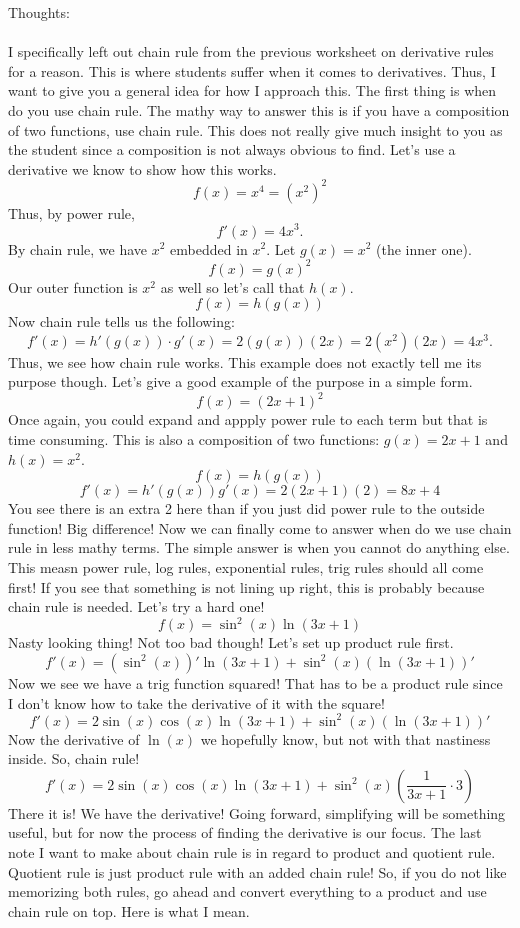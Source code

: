 \documentclass[10pt]{article}
\theoremstyle{Theorem}
\theoremstyle{definition}
\theoremstyle{remark}
\theoremstyle{custom}
\begin{document}
\thispagestyle{firststyle}
\pagestyle{plain}

Thoughts:\\\\
I specifically left out chain rule from the previous worksheet on derivative rules for a reason. This is where students suffer when it comes to derivatives. Thus, I want to give you a general idea for how I approach this. The first thing is when do you use chain rule. The mathy way to answer this is if you have a composition of two functions, use chain rule. This does not really give much insight to you as the student since a composition is not always obvious to find. Let's use a derivative we know to show how this works.
\[
f(x)=x^4=(x^2)^2
\]
Thus, by power rule,
\[
f'(x)=4x^3.
\]
By chain rule, we have $x^2$ embedded in $x^2$. Let $g(x)=x^2$ (the inner one).
\[
f(x)=g(x)^2
\]
Our outer function is $x^2$ as well so let's call that $h(x)$.
\[
f(x)=h(g(x))
\]
Now chain rule tells us the following:
\[
f'(x)=h'(g(x))\cdot g'(x)=2(g(x))(2x)=2(x^2)(2x)=4x^3.
\]
Thus, we see how chain rule works.  This example does not exactly tell me its purpose though. Let's give a good example of the purpose in a simple form.
\[
f(x)=(2x+1)^2
\]
Once again, you could expand and appply power rule to each term but that is time consuming. This is also a composition of two functions: $g(x)=2x+1$ and $h(x)=x^2$.
\[
f(x)=h(g(x))
\]
\[
f'(x)=h'(g(x))g'(x)=2(2x+1)(2)=8x+4
\]
You see there is an extra 2 here than if you just did power rule to the outside function! Big difference! Now we can finally come to answer when do we use chain rule in less mathy terms. The simple answer is when you cannot do anything else. This measn power rule, log rules, exponential rules, trig rules should all come first! If you see that something is not lining up right, this is probably because chain rule is needed. Let's try a hard one!
\[
f(x)=\sin^2(x)\ln(3x+1)
\]
Nasty looking thing! Not too bad though! Let's set up product rule first.
\[
f'(x)=(\sin^2(x))'\ln(3x+1)+\sin^2(x)(\ln(3x+1))'
\]
Now we see we have a trig function squared! That has to be a product rule since I don't know how to take the derivative of it with the square!
\[
f'(x)=2\sin(x)\cos(x)\ln(3x+1)+\sin^2(x)(\ln(3x+1))'
\]
Now the derivative of $\ln(x)$ we hopefully know, but not with that nastiness inside. So, chain rule!
\[
f'(x)=2\sin(x)\cos(x)\ln(3x+1)+\sin^2(x)\left(\dfrac{1}{3x+1}\cdot 3\right)
\]
There it is! We have the derivative! Going forward, simplifying will be something useful, but for now the process of finding the derivative is our focus. The last note I want to make about chain rule is in regard to product and quotient rule. Quotient rule is just product rule with an added chain rule! So, if you do not like memorizing both rules, go ahead and convert everything to a product and use chain rule on top. Here is what I mean.
\end{document}
